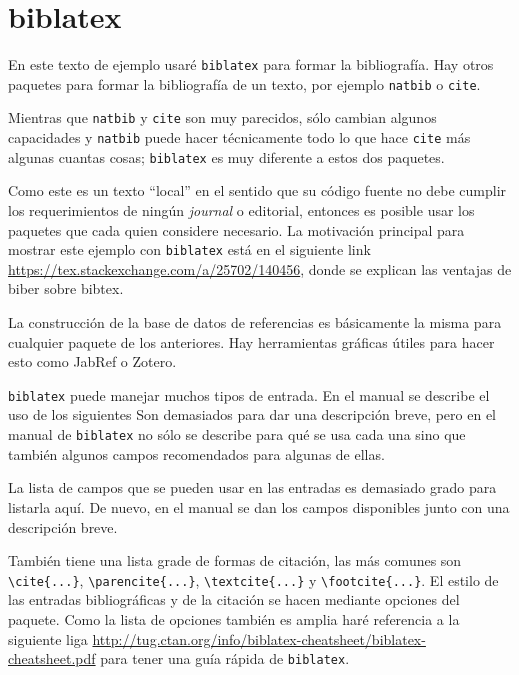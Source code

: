 \section{biblatex}%
\label{sec:bib}
En este texto de ejemplo usaré \texttt{biblatex} para formar la bibliografía.
Hay otros paquetes para formar la bibliografía de un texto, por ejemplo
\texttt{natbib} o \texttt{cite}.

Mientras que \texttt{natbib} y \texttt{cite} son muy parecidos, sólo cambian
algunos capacidades y \texttt{natbib} puede hacer técnicamente todo lo que
hace \texttt{cite} más algunas cuantas cosas; \texttt{biblatex} es muy
diferente a estos dos paquetes.

Como este es un texto ``local'' en el sentido que su código fuente no debe
cumplir los requerimientos de ningún \textit{journal} o editorial, entonces
es posible usar los paquetes que cada quien considere necesario. La
motivación principal para mostrar este ejemplo con \texttt{biblatex} está
en el siguiente link \url{https://tex.stackexchange.com/a/25702/140456},
donde se explican las ventajas de biber sobre bibtex.

La construcción de la base de datos de referencias es básicamente la misma
para cualquier paquete de los anteriores. Hay herramientas gráficas útiles
para hacer esto como JabRef o Zotero.

\texttt{biblatex} puede manejar muchos tipos de entrada. En el manual se
describe el uso de los siguientes
Son demasiados para dar una descripción breve, pero en el manual de
\texttt{biblatex} no sólo se describe para qué se usa cada una sino que
también algunos campos recomendados para algunas de ellas.

La lista de campos que se pueden usar en las entradas es demasiado grado para
listarla aquí. De nuevo, en el manual se dan los campos disponibles junto con
una descripción breve.

También tiene una lista grade de formas de citación, las más comunes son
\verb|\cite{...}|, \verb|\parencite{...}|, \verb|\textcite{...}| y
\verb|\footcite{...}|. El estilo de las entradas bibliográficas y de la
citación se hacen mediante opciones del paquete. Como la lista de opciones
también es amplia haré referencia a la siguiente liga
\url{http://tug.ctan.org/info/biblatex-cheatsheet/biblatex-cheatsheet.pdf}
para tener una guía rápida de \texttt{biblatex}.

